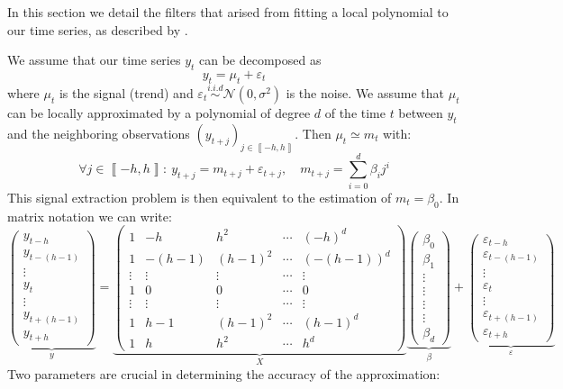 \documentclass[
  12pt,
  ,
  a4paper]{article}
\newcommand\1{\mathds{1}}
\begin{document}
In this section we detail the filters that arised from fitting a local polynomial to our time series, as described by \textcite{proietti2008}.

We assume that our time series \(y_t\) can be decomposed as
\[
y_t=\mu_t+\varepsilon_t
\]
where \(\mu_t\) is the signal (trend) and \(\varepsilon_{t}\overset{i.i.d}{\sim}\mathcal{N}(0,\sigma^{2})\) is the noise.
We assume that \(\mu_t\) can be locally approximated by a polynomial of degree \(d\) of the time \(t\) between \(y_t\) and the neighboring observations \(\left(y_{t+j}\right)_{j\in\left\llbracket -h,h\right\rrbracket}\). Then \(\mu_t\simeq m_{t}\) with:
\[
\forall j\in\left\llbracket -h,h\right\rrbracket :\:
y_{t+j}=m_{t+j}+\varepsilon_{t+j},\quad m_{t+j}=\sum_{i=0}^{d}\beta_{i}j^{i}
\]
This signal extraction problem is then equivalent to the estimation of \(m_t=\beta_0\). In matrix notation we can write:
\[
\underbrace{\begin{pmatrix}y_{t-h}\\
y_{t-(h-1)}\\
\vdots\\
y_{t}\\
\vdots\\
y_{t+(h-1)}\\
y_{t+h}
\end{pmatrix}}_{y}=\underbrace{\begin{pmatrix}1 & -h & h^{2} & \cdots & (-h)^{d}\\
1 & -(h-1) & (h-1)^{2} & \cdots & (-(h-1))^{d}\\
\vdots & \vdots & \vdots & \cdots & \vdots\\
1 & 0 & 0 & \cdots & 0\\
\vdots & \vdots & \vdots & \cdots & \vdots\\
1 & h-1 & (h-1)^{2} & \cdots & (h-1)^{d}\\
1 & h & h^{2} & \cdots & h^{d}
\end{pmatrix}}_{X}\underbrace{\begin{pmatrix}\beta_{0}\\
\beta_{1}\\
\vdots\\
\vdots\\
\vdots\\
\vdots\\
\beta_{d}
\end{pmatrix}}_{\beta}+\underbrace{\begin{pmatrix}\varepsilon_{t-h}\\
\varepsilon_{t-(h-1)}\\
\vdots\\
\varepsilon_{t}\\
\vdots\\
\varepsilon_{t+(h-1)}\\
\varepsilon_{t+h}
\end{pmatrix}}_{\varepsilon}
\]
Two parameters are crucial in determining the accuracy of the approximation:
\end{document}
